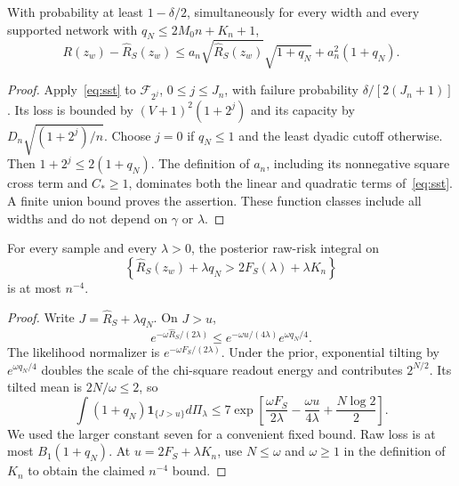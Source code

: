 \begin{lemma}
\label{lem:statistical-event}
With probability at least $1-\delta/2$, simultaneously for every width and every supported network with $q_N\le2M_0n+K_n+1$,
\begin{equation}
 R(z_w)-\widehat R_S(z_w)
 \le a_n\sqrt{\widehat R_S(z_w)}\sqrt{1+q_N}
                                  +a_n^2(1+q_N).
 \label{eq:adaptive-stat-event}
\end{equation}
\end{lemma}
\begin{proof}
Apply~\eqref{eq:sst} to $\mathcal F_{2^j}$, $0\le j\le J_n$, with failure probability $\delta/[2(J_n+1)]$. Its loss is bounded by $(V+1)^2(1+2^j)$ and its capacity by $D_n\sqrt{(1+2^j)/n}$. Choose $j=0$ if $q_N\le1$ and the least dyadic cutoff otherwise. Then $1+2^j\le2(1+q_N)$. The definition of $a_n$, including its nonnegative square cross term and $C_*\ge1$, dominates both the linear and quadratic terms of~\eqref{eq:sst}. A finite union bound proves the assertion. These function classes include all widths and do not depend on $\gamma$ or $\lambda$.
\end{proof}

\begin{lemma}
\label{lem:objective-tail}
For every sample and every $\lambda>0$, the posterior raw-risk integral on
\[
 \left\{\widehat R_S(z_w)+\lambda q_N>
                    2F_S(\lambda)+\lambda K_n\right\}
\]
is at most $n^{-4}$.
\end{lemma}
\begin{proof}
Write $J=\widehat R_S+\lambda q_N$. On $J>u$,
\[
 e^{-\omega\widehat R_S/(2\lambda)}
 \le e^{-\omega u/(4\lambda)}e^{\omega q_N/4}.
\]
The likelihood normalizer is $e^{-\omega F_S/(2\lambda)}$. Under the prior, exponential tilting by $e^{\omega q_N/4}$ doubles the scale of the chi-square readout energy and contributes $2^{N/2}$. Its tilted mean is $2N/\omega\le2$, so
\[
 \int(1+q_N)\mathbf1_{\{J>u\}}d\Pi_\lambda
 \le7\exp\left[\frac{\omega F_S}{2\lambda}
                   -\frac{\omega u}{4\lambda}+\frac{N\log2}{2}\right].
\]
We used the larger constant seven for a convenient fixed bound. Raw loss is at most $B_1(1+q_N)$. At $u=2F_S+\lambda K_n$, use $N\le\omega$ and $\omega\ge1$ in the definition of $K_n$ to obtain the claimed $n^{-4}$ bound.
\end{proof}

